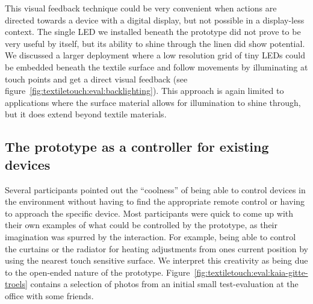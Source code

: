 This visual feedback technique could be very convenient when actions are directed towards a device with a digital display, but not possible in a display-less context.
The single LED we installed beneath the prototype did not prove to be very useful by itself, but its ability to shine through the linen did show potential.
We discussed a larger deployment where a low resolution grid of tiny LEDs could be embedded beneath the textile surface and follow movements by illuminating at touch points and get a direct visual feedback (see figure~\ref{fig:textiletouch:eval:backlighting}).
This approach is again limited to applications where the surface material allows for illumination to shine through, but it does extend beyond textile materials.

\subsection{The prototype as a controller for existing devices}

Several participants pointed out the ``coolness'' of being able to control devices in the environment without having to find the appropriate remote control or having to approach the specific device.
Most participants were quick to come up with their own examples of what could be controlled by the prototype, as their imagination was spurred by the interaction.
For example, being able to control the curtains or the radiator for heating adjustments from ones current position by using the nearest touch sensitive surface.
We interpret this creativity as being due to the open-ended nature of the prototype.
Figure~\ref{fig:textiletouch:eval:kaia-gitte-troels} contains a selection of photos from an initial small test-evaluation at the office with some friends.

